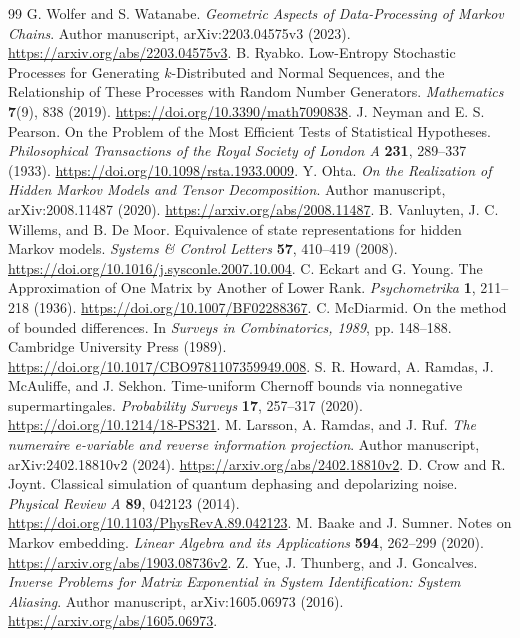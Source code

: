 \documentclass[11pt,a4paper]{article}
\begin{document}
\setcounter{page}{2}
\setcounter{section}{5}

\clearpage
\begin{thebibliography}{99}
G. Wolfer and S. Watanabe.
\emph{Geometric Aspects of Data-Processing of Markov Chains}.
Author manuscript, arXiv:2203.04575v3 (2023).
\url{https://arxiv.org/abs/2203.04575v3}.
B. Ryabko.
Low-Entropy Stochastic Processes for Generating \(k\)-Distributed and Normal
Sequences, and the Relationship of These Processes with Random Number Generators.
\emph{Mathematics} \textbf{7}(9), 838 (2019).
\url{https://doi.org/10.3390/math7090838}.
J. Neyman and E. S. Pearson.
On the Problem of the Most Efficient Tests of Statistical Hypotheses.
\emph{Philosophical Transactions of the Royal Society of London A}
\textbf{231}, 289--337 (1933).
\url{https://doi.org/10.1098/rsta.1933.0009}.
Y. Ohta.
\emph{On the Realization of Hidden Markov Models and Tensor Decomposition}.
Author manuscript, arXiv:2008.11487 (2020).
\url{https://arxiv.org/abs/2008.11487}.
B. Vanluyten, J. C. Willems, and B. De Moor.
Equivalence of state representations for hidden Markov models.
\emph{Systems \& Control Letters} \textbf{57}, 410--419 (2008).
\url{https://doi.org/10.1016/j.sysconle.2007.10.004}.
C. Eckart and G. Young.
The Approximation of One Matrix by Another of Lower Rank.
\emph{Psychometrika} \textbf{1}, 211--218 (1936).
\url{https://doi.org/10.1007/BF02288367}.
C. McDiarmid.
On the method of bounded differences.
In \emph{Surveys in Combinatorics, 1989}, pp. 148--188.
Cambridge University Press (1989).
\url{https://doi.org/10.1017/CBO9781107359949.008}.
S. R. Howard, A. Ramdas, J. McAuliffe, and J. Sekhon.
Time-uniform Chernoff bounds via nonnegative supermartingales.
\emph{Probability Surveys} \textbf{17}, 257--317 (2020).
\url{https://doi.org/10.1214/18-PS321}.
M. Larsson, A. Ramdas, and J. Ruf.
\emph{The numeraire e-variable and reverse information projection}.
Author manuscript, arXiv:2402.18810v2 (2024).
\url{https://arxiv.org/abs/2402.18810v2}.
D. Crow and R. Joynt.
Classical simulation of quantum dephasing and depolarizing noise.
\emph{Physical Review A} \textbf{89}, 042123 (2014).
\url{https://doi.org/10.1103/PhysRevA.89.042123}.
M. Baake and J. Sumner.
Notes on Markov embedding.
\emph{Linear Algebra and its Applications} \textbf{594}, 262--299 (2020).
\url{https://arxiv.org/abs/1903.08736v2}.
Z. Yue, J. Thunberg, and J. Goncalves.
\emph{Inverse Problems for Matrix Exponential in System Identification:
System Aliasing}.
Author manuscript, arXiv:1605.06973 (2016).
\url{https://arxiv.org/abs/1605.06973}.
\end{thebibliography}
\end{document}
